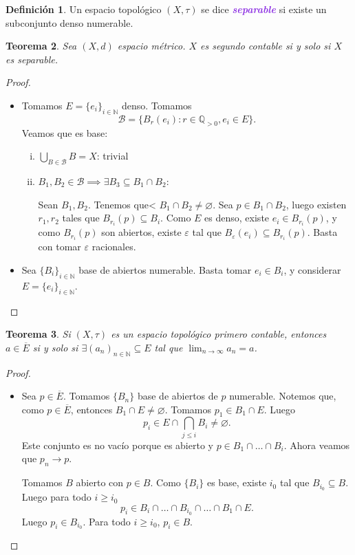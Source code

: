 \documentclass{article}
\newtheorem{theorem}{Teorema}[subsection]
\theoremstyle{definition}
\newtheorem{definition}[theorem]{Definición}
\theoremstyle{remark}
\numberwithin{equation}{section}
\newcommand{\B}{\mathcal{B}}
\newcommand{\N}{\mathbb{N}}
\newcommand{\Q}{\mathbb{Q}}
\newcommand{\e}{\varepsilon}
\renewcommand{\t}{\tau}
\newcommand{\oo}{\infty}
\renewcommand{\bar}{\overline}
\newcommand{\wea}[1]{\textcolor{BlueViolet}{\textbf{\emph{#1}}}}
\begin{document}
\begin{definition}
  Un espacio topológico $(X,\t)$ se dice \wea{separable} si existe un subconjunto denso numerable.
\end{definition}

\begin{theorem}
  Sea $(X,d)$ espacio métrico. $X$ es segundo contable si y solo si $X$ es separable.
\end{theorem}
\begin{proof}\
  \begin{itemize}
    \item \boxed{\impliedby} Tomamos $E = \{e_i\}_{i\in\N}$ denso. Tomamos $$\B = \{B_r(e_i) \colon r \in \Q_{>0}, e_i \in E\}.$$
    Veamos que es base:
    \begin{enumerate}[(i)]
      \item $\bigcup_{B\in\B} B = X$: trivial %
      \item $B_1, B_2\in \B \implies \exists B_3 \subseteq B_1 \cap B_2$:
      
      Sean $B_1, B_2$. Tenemos que< $B_1 \cap B_2 \neq \varnothing$. Sea $p \in B_1 \cap B_2$, luego existen $r_1,r_2$ tales que $B_{r_i}(p) \subseteq B_i$. Como $E$ es denso, existe $e_i \in B_{r_i}(p)$, y como $B_{r_i}(p)$ son abiertos, existe $\e$ tal que $B_\e(e_i) \subseteq B_{r_i}(p)$. Basta con tomar $\e$ racionales.
    \end{enumerate}

    \item \boxed{\implies} Sea $\{B_i\}_{i\in\N}$ base de abiertos numerable. Basta tomar $e_i \in B_i$, y considerar $E = \{e_i\}_{i\in\N}$.
  \end{itemize}
\end{proof}

\begin{theorem}
  Si $(X,\t)$ es un espacio topológico primero contable, entonces $a \in \bar{E}$ si y solo si $\exists (a_n)_{n\in\N} \subseteq E$ tal que $\lim_{n\to\oo} a_n = a$.
\end{theorem}
\begin{proof}\
  \begin{itemize}
    \item \boxed{\implies} Sea $p \in \bar{E}$. Tomamos $\{B_n\}$ base de abiertos de $p$ numerable. Notemos que, como $p \in \bar{E}$, entonces $B_1 \cap E \neq \varnothing$. Tomamos $p_1 \in B_1 \cap E$. Luego
    \[p_i \in E \cap \bigcap_{j\leq i} B_i \neq \varnothing.\]
    Este conjunto es no vacío porque es abierto y $p \in B_1 \cap \dots \cap B_i$.
    Ahora veamos que $p_n \to p$.

    Tomamos $B$ abierto con $p \in B$. Como $\{B_i\}$ es base, existe $i_0$ tal que $B_{i_0} \subseteq B$. Luego para todo $i \geq i_0$
    \[p_i \in B_i \cap \dots \cap B_{i_0} \cap \dots \cap B_1 \cap E.\]
    Luego $p_i \in B_{i_0}$. Para todo $i \geq i_0$, $p_i \in B$.
  \end{itemize}
\end{proof}
\end{document}
